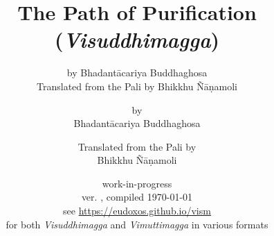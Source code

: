 


	\title{The Path of Purification \\ (\emph{Visuddhimagga})}
	\date{work-in-progress \\ ver. \vismCommitHref, compiled \today \\ see \url{https://eudoxos.github.io/vism}  \\ for both \emph{Visuddhimagga} and \emph{Vimuttimagga} in various formats}
	\ifplastex
		\author{by Bhadantācariya Buddhaghosa \\ Translated from the Pali by Bhikkhu Ñāṇamoli}
	\else
		\author{by \\ Bhadantācariya Buddhaghosa \and Translated from the Pali by \\ Bhikkhu Ñāṇamoli}
	\fi
	\maketitle

	\frontmatter
		\bgroup
			\ifplastex\else\renewcommand{\baselinestretch}{0.2}\normalsize\fi
			\tableofcontents
		\egroup
		

